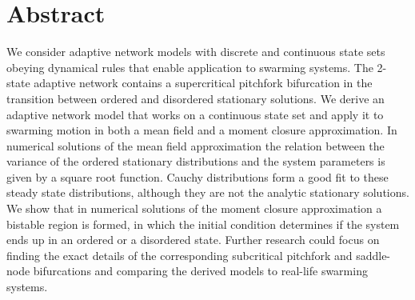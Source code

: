 \chapter{Abstract}
We consider adaptive network models with discrete and continuous state sets obeying dynamical rules that enable application to swarming systems. The 2-state adaptive network contains a supercritical pitchfork bifurcation in the transition between ordered and disordered stationary solutions. We derive an adaptive network model that works on a continuous state set and apply it to swarming motion in both a mean field and a moment closure approximation. In numerical solutions of the mean field approximation the relation between the variance of the ordered stationary distributions and the system parameters is given by a square root function. Cauchy distributions form a good fit to these steady state distributions, although they are not the analytic stationary solutions. We show that in numerical solutions of the moment closure approximation a bistable region is formed, in which the initial condition determines if the system ends up in an ordered or a disordered state. Further research could focus on finding the exact details of the corresponding subcritical pitchfork and saddle-node bifurcations and comparing the derived models to real-life swarming systems.